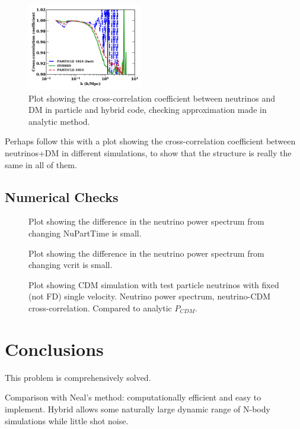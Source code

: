 \documentclass[useAMS, usenatbib]{mnras}
\begin{document}
\begin{figure}
\includegraphics[width=0.45\textwidth]{nuplots/corr_coeff-1.pdf}
  \caption{Plot showing the cross-correlation coefficient between neutrinos
  and DM in particle and hybrid code, checking approximation made in analytic method.
  }
  \label{fig:cross-corr}
\end{figure}

Perhaps follow this with a plot showing the cross-correlation coefficient between neutrinos+DM
in different simulations, to show that the structure is really the same in all of them.


\subsection{Numerical Checks}

\begin{figure}
  \caption{Plot showing the difference in the neutrino power spectrum from changing NuPartTime is small. }
  \label{fig:nuparttime}
\end{figure}

\begin{figure}
  \caption{Plot showing the difference in the neutrino power spectrum from changing vcrit is small. }
  \label{fig:vcrit}
\end{figure}

\begin{figure}
    \caption{Plot showing CDM simulation with test particle neutrinos with fixed (not FD) single velocity.
  Neutrino power spectrum, neutrino-CDM cross-correlation. Compared to analytic $P_{CDM}$.}
  \label{fig:testpart}
\end{figure}


\section{Conclusions}
\label{sec:conclusion}

This problem is comprehensively solved.

Comparison with Neal's method:
computationally efficient and easy to implement.
Hybrid allows some naturally large dynamic range of N-body simulations while little shot noise.
\end{document}
